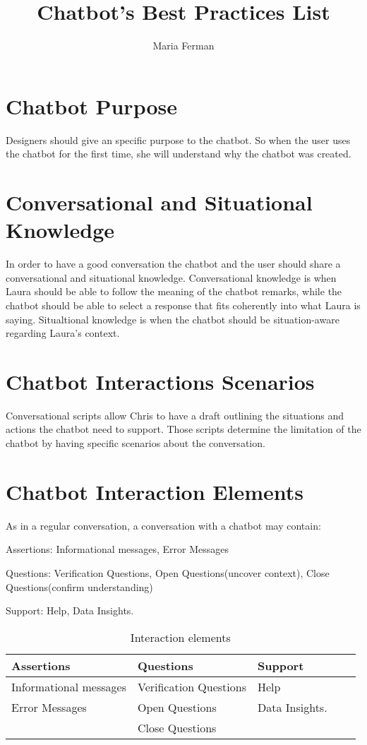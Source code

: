 \documentclass[a4paper,10pt]{article}
\title{Chatbot's Best Practices List}
\author{Maria Ferman}
\begin{document}
\maketitle
\section{Chatbot Purpose}

Designers should give an specific purpose to the chatbot. So when the user uses the chatbot for the first time, she will understand why the chatbot was created. 

\section{Conversational and Situational Knowledge}

In order to have a good conversation the chatbot and the user should share a conversational and situational knowledge.  Conversational knowledge is when Laura should be able to follow the meaning of the chatbot remarks, while the chatbot should be able to select a response that fits coherently into what Laura is saying. Situaltional knowledge is when the chatbot should be situation-aware regarding Laura’s context.

\section{Chatbot Interactions Scenarios}

Conversational scripts allow Chris to have a draft outlining the situations and actions the chatbot need to support. Those scripts determine the limitation of the chatbot by having specific scenarios about the conversation. 

\section{Chatbot Interaction Elements}

As in a regular conversation, a conversation with a chatbot may contain:

Assertions: Informational messages, Error Messages

Questions: Verification Questions, Open Questions(uncover context), Close Questions(confirm understanding)

Support: Help, Data Insights.

\begin{table}[]
\centering

\label{InteractionElementsTable}
\begin{tabular}{lllll}
\hline
\textbf{Assertions}    & \textbf{Questions}     & \textbf{Support}   \\
\hline
Informational messages & Verification Questions & Help      \\
Error Messages         & Open Questions         & Data Insights.  \\
                       & Close Questions        &       \\
     \hline                   
\end{tabular}
\caption{Interaction elements}
\end{table}
\end{document}
